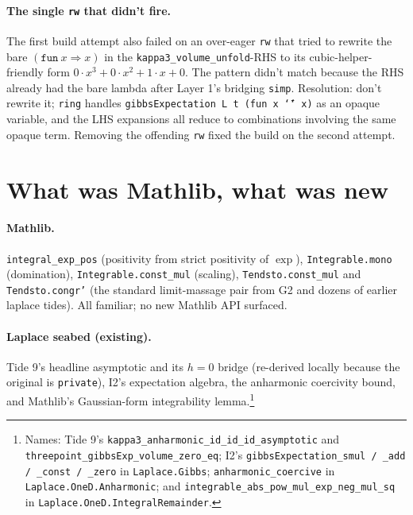 \documentclass[11pt]{article}
\begin{document}
\paragraph{The single \texttt{rw} that didn't fire.} The first build
attempt also failed on an over-eager \texttt{rw} that tried to rewrite
the bare $(\mathtt{fun}\ x \Rightarrow x)$ in the
\texttt{kappa3\_volume\_unfold}-RHS to its cubic-helper-friendly form
$0 \cdot x^3 + 0 \cdot x^2 + 1 \cdot x + 0$. The pattern didn't match
because the RHS already had the bare lambda after Layer 1's bridging
\texttt{simp}. Resolution: don't rewrite it; \texttt{ring} handles
\texttt{gibbsExpectation L t (fun x \char`\=\char`\>\ x)} as an
opaque variable, and the LHS expansions all reduce to combinations
involving the same opaque term. Removing the offending \texttt{rw}
fixed the build on the second attempt.

\section{What was Mathlib, what was new}

\paragraph{Mathlib.} \texttt{integral\_exp\_pos} (positivity from
strict positivity of $\exp$), \texttt{Integrable.mono}
(domination), \texttt{Integrable.const\_mul} (scaling),
\texttt{Tendsto.const\_mul} and \texttt{Tendsto.congr'} (the standard
limit-massage pair from G2 and dozens of earlier laplace tides). All
familiar; no new Mathlib API surfaced.

\paragraph{Laplace seabed (existing).} Tide 9's headline asymptotic
and its $h = 0$ bridge (re-derived locally because the original is
\texttt{private}), I2's expectation algebra, the anharmonic coercivity
bound, and Mathlib's Gaussian-form integrability
lemma.\footnote{Names: Tide 9's
\texttt{kappa3\_anharmonic\_id\_id\_id\_asymptotic} and
\texttt{threepoint\_gibbsExp\_volume\_zero\_eq};
I2's \texttt{gibbsExpectation\_smul / \_add / \_const / \_zero}
in \texttt{Laplace.Gibbs}; \texttt{anharmonic\_coercive} in
\texttt{Laplace.OneD.Anharmonic}; and
\texttt{integrable\_abs\_pow\_mul\_exp\_neg\_mul\_sq} in
\texttt{Laplace.OneD.IntegralRemainder}.}
\end{document}
